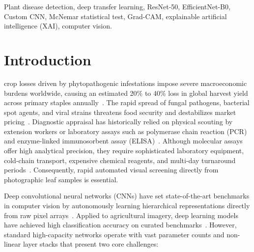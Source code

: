 \documentclass[journal]{IEEEtran}
\begin{document}
\begin{IEEEkeywords}
Plant disease detection, deep transfer learning, ResNet-50, EfficientNet-B0, Custom CNN, McNemar statistical test, Grad-CAM, explainable artificial intelligence (XAI), computer vision.
\end{IEEEkeywords}

\section{Introduction}
 crop losses driven by phytopathogenic infestations impose severe macroeconomic burdens worldwide, causing an estimated 20\% to 40\% loss in global harvest yield across primary staples annually~\cite{hughes2015, mohanty2016, savary2019}. The rapid spread of fungal pathogens, bacterial spot agents, and viral strains threatens food security and destabilizes market pricing~\cite{barbedo2013}. Diagnostic appraisal has historically relied on physical scouting by extension workers or laboratory assays such as polymerase chain reaction (PCR) and enzyme-linked immunosorbent assay (ELISA)~\cite{martin2000, sankaran2010}. Although molecular assays offer high analytical precision, they require sophisticated laboratory equipment, cold-chain transport, expensive chemical reagents, and multi-day turnaround periods~\cite{sankaran2010}. Consequently, rapid automated visual screening directly from photographic leaf samples is essential.

Deep convolutional neural networks (CNNs) have set state-of-the-art benchmarks in computer vision by autonomously learning hierarchical representations directly from raw pixel arrays~\cite{krizhevsky2012, lecun2015}. Applied to agricultural imagery, deep learning models have achieved high classification accuracy on curated benchmarks~\cite{ferentinos2018, too2019, chen2020}. However, standard high-capacity networks operate with vast parameter counts and non-linear layer stacks that present two core challenges:
\end{document}
